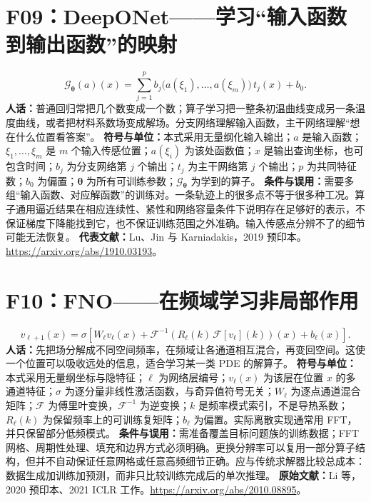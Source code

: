 \documentclass[UTF8,zihao=-4,openany,oneside,fontset=windows]{ctexbook}
\begin{document}
\section{F09：DeepONet——学习“输入函数到输出函数”的映射}
\begin{equation}
 \mathcal G_{\boldsymbol\theta}(a)(x)
 =\sum_{j=1}^{p}b_j\bigl(a(\xi_1),\ldots,a(\xi_m)\bigr)\,t_j(x)+b_0.
\end{equation}
\textbf{人话：}普通回归常把几个数变成一个数；算子学习把一整条初温曲线变成另一条温度曲线，或者把材料系数场变成解场。分支网络理解输入函数，主干网络理解“想在什么位置看答案”。
\textbf{符号与单位：}本式采用无量纲化输入输出；$a$ 是输入函数；$\xi_1,\ldots,\xi_m$ 是 $m$ 个输入传感位置；$a(\xi_i)$ 为该处函数值；$x$ 是输出查询坐标，也可包含时间；$b_j$ 为分支网络第 $j$ 个输出；$t_j$ 为主干网络第 $j$ 个输出；$p$ 为共同特征数；$b_0$ 为偏置；$\boldsymbol\theta$ 为所有可训练参数；$\mathcal G_{\boldsymbol\theta}$ 为学到的算子。
\textbf{条件与误用：}需要多组“输入函数、对应解函数”的训练对。一条轨迹上的很多点不等于很多种工况。算子通用逼近结果在相应连续性、紧性和网络容量条件下说明存在足够好的表示，不保证梯度下降能找到它，也不保证训练范围之外准确。输入传感点分辨不了的细节可能无法恢复。
\textbf{代表文献：}Lu、Jin 与 Karniadakis，2019 预印本。\url{https://arxiv.org/abs/1910.03193}。

\section{F10：FNO——在频域学习非局部作用}
\begin{equation}
 v_{\ell+1}(x)=\sigma\!\left[
 W_\ell v_\ell(x)+\mathcal F^{-1}\!\left(R_\ell(k)\,\mathcal F[v_\ell](k)\right)(x)+b_\ell(x)
 \right].
\end{equation}
\textbf{人话：}先把场分解成不同空间频率，在频域让各通道相互混合，再变回空间。这使一个位置可以吸收远处的信息，适合学习某一类 PDE 的解算子。
\textbf{符号与单位：}本式采用无量纲坐标与隐特征；$\ell$ 为网络层编号；$v_\ell(x)$ 为该层在位置 $x$ 的多通道特征；$\sigma$ 为逐分量非线性激活函数，与奇异值符号无关；$W_\ell$ 为逐点通道混合矩阵；$\mathcal F$ 为傅里叶变换，$\mathcal F^{-1}$ 为逆变换；$k$ 是频率模式索引，不是导热系数；$R_\ell(k)$ 为保留频率上的可训练复矩阵；$b_\ell$ 为偏置。实际离散实现通常用 FFT，并只保留部分低频模式。
\textbf{条件与误用：}需准备覆盖目标问题族的训练数据；FFT 网格、周期性处理、填充和边界方式必须明确。更换分辨率可以复用一部分算子结构，但并不自动保证任意网格或任意高频细节正确。应与传统求解器比较总成本：数据生成加训练加预测，而非只比较训练完成后的单次推理。
\textbf{原始文献：}Li 等，2020 预印本、2021 ICLR 工作。\url{https://arxiv.org/abs/2010.08895}。
\end{document}
